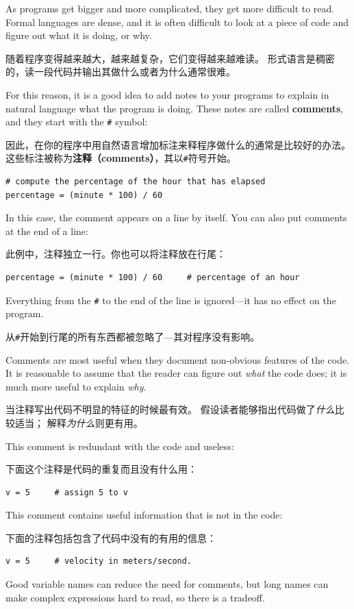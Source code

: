 \documentclass[10pt]{book}
\begin{document}
\begin{CJK}{UTF8}{gbsn}
As programs get bigger and more complicated, they get more difficult
to read.  Formal languages are dense, and it is often difficult to
look at a piece of code and figure out what it is doing, or why.

随着程序变得越来越大，越来越复杂，它们变得越来越难读。
形式语言是稠密的，读一段代码并输出其做什么或者为什么通常很难。

For this reason, it is a good idea to add notes to your programs to explain
in natural language what the program is doing.  These notes are called
{\bf comments}, and they start with the \verb"#" symbol:

因此，在你的程序中用自然语言增加标注来释程序做什么的通常是比较好的办法。
这些标注被称为{\bf 注释（comments）}，其以\verb"#"符号开始。

\begin{verbatim}
# compute the percentage of the hour that has elapsed
percentage = (minute * 100) / 60
\end{verbatim}
%
In this case, the comment appears on a line by itself.  You can also put
comments at the end of a line:

此例中，注释独立一行。你也可以将注释放在行尾：

\begin{verbatim}
percentage = (minute * 100) / 60     # percentage of an hour
\end{verbatim}
%
Everything from the {\tt \#} to the end of the line is ignored---it
has no effect on the program.

从{\tt \#}开始到行尾的所有东西都被忽略了---其对程序没有影响。

Comments are most useful when they document non-obvious features of
the code.  It is reasonable to assume that the reader can figure out
{\em what} the code does; it is much more useful to explain {\em why}.

当注释写出代码不明显的特征的时候最有效。
假设读者能够指出代码做了{\em 什么}比较适当；
解释{\em 为什么}则更有用。

This comment is redundant with the code and useless:

下面这个注释是代码的重复而且没有什么用：

\begin{verbatim}
v = 5     # assign 5 to v
\end{verbatim}
%
This comment contains useful information that is not in the code:

下面的注释包括包含了代码中没有的有用的信息：

\begin{verbatim}
v = 5     # velocity in meters/second. 
\end{verbatim}
%
Good variable names can reduce the need for comments, but
long names can make complex expressions hard to read, so there is
a tradeoff.


\end{CJK}
\end{document}
